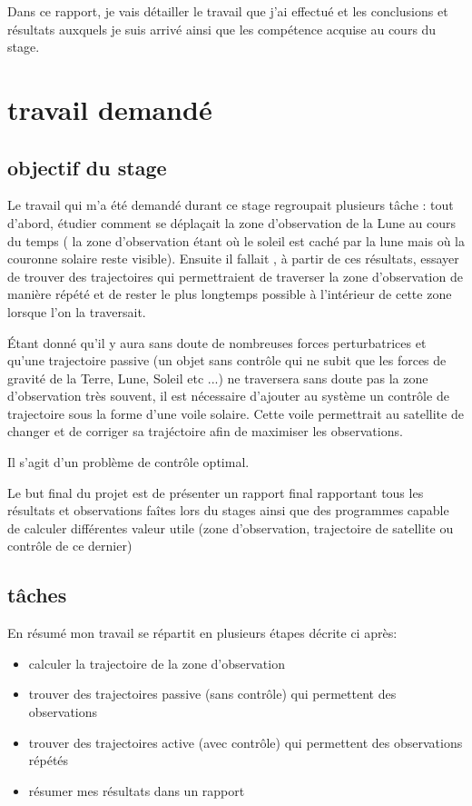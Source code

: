 \documentclass{article} %
\begin{document}
		 Dans ce rapport, je vais détailler le travail que j'ai effectué et les conclusions et résultats auxquels je suis arrivé ainsi que les compétence acquise au cours du stage.
		 
		 \newpage
		\section{travail demandé}
		\subsection{objectif du stage}
		Le travail qui m'a été demandé durant ce stage regroupait plusieurs tâche : tout d'abord, étudier comment se déplaçait la zone d'observation de la Lune  au cours du temps ( la zone d'observation étant où le soleil est caché par la lune mais où la couronne solaire reste visible). Ensuite il fallait , à partir de ces résultats, essayer de trouver des trajectoires qui permettraient de traverser la zone d'observation de manière répété et de rester le plus longtemps possible à l'intérieur de cette zone lorsque l'on la traversait.
		
		Étant donné qu'il y aura sans doute de nombreuses forces perturbatrices et qu'une trajectoire passive (un objet sans contrôle qui ne subit que les forces de gravité de la Terre, Lune, Soleil etc ...) ne traversera sans doute pas la zone d'observation très souvent, il est nécessaire d'ajouter au système un contrôle de trajectoire sous la forme d'une voile solaire. Cette voile permettrait au satellite de changer et de corriger sa trajéctoire afin de maximiser les observations.
		
		Il s'agit d'un problème de contrôle optimal.
		
		Le but final du projet est de présenter un rapport final rapportant tous les résultats et observations faîtes lors du stages ainsi que des programmes capable de calculer différentes valeur utile (zone d'observation, trajectoire de satellite ou contrôle de ce dernier)
		
		\subsection{tâches}
		En résumé mon travail se répartit en plusieurs étapes décrite ci après:
		\begin{itemize}
			\item calculer la trajectoire de la zone d'observation
			\item trouver des trajectoires passive (sans contrôle) qui permettent des observations
			\item trouver des trajectoires active (avec contrôle) qui permettent des observations répétés 
			\item résumer mes résultats dans un rapport
		\end{itemize}
		
\end{document}
